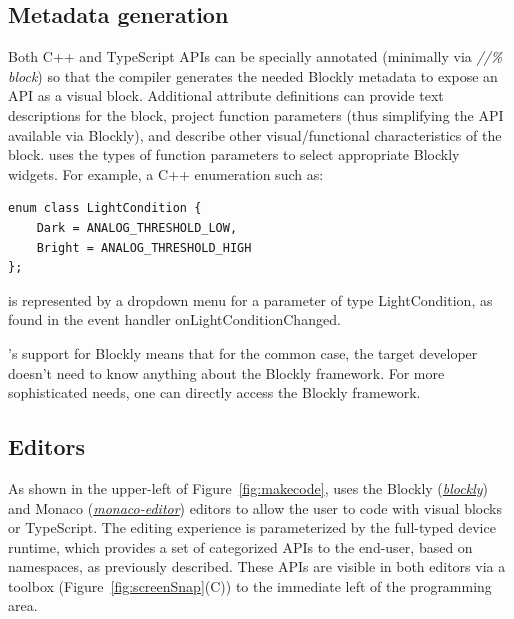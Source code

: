 \subsection{Metadata generation}

Both C++ and TypeScript APIs can be specially annotated (minimally via 
\emph{//\% block}) so that the \MC compiler generates the needed
Blockly metadata to expose an API as a visual block.
Additional attribute definitions can provide text descriptions for the block, project function
parameters (thus simplifying the API available via Blockly), and describe other visual/functional
characteristics of the block.  \MC uses the types of function parameters to select appropriate
Blockly widgets.  For example, a C++ enumeration such as:
\begin{lstlisting}
enum class LightCondition {
    Dark = ANALOG_THRESHOLD_LOW,
    Bright = ANALOG_THRESHOLD_HIGH
};
\end{lstlisting}
is represented by a dropdown menu for a parameter of type LightCondition, as found in
the event handler onLightConditionChanged.
 
\MCN's support for Blockly means that for the common case, the target developer doesn't need
to know anything about the Blockly framework.
For more sophisticated needs, one can directly access the Blockly framework. 

\subsection{Editors}

As shown in the upper-left of Figure~\ref{fig:makecode},
\MC uses the Blockly (\emph{\href{https://github.com/google/blockly}{blockly}}) and Monaco 
(\emph{\href{https://github.com/Microsoft/monaco-editor}{monaco-editor}}) editors to allow the user to code with
visual blocks or TypeScript. The editing experience is parameterized by the full-typed device
runtime, which provides a set of categorized APIs to the end-user, based on namespaces, as
previously described. These APIs are visible in both editors via a toolbox (Figure~\ref{fig:screenSnap}(C))
to the immediate left of the programming area. 

